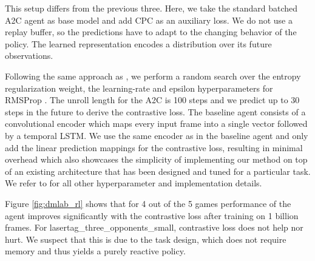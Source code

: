 This setup differs from the previous three. Here, we take the standard batched A2C \cite{mnih2016asynchronous} agent as base model and add CPC as an auxiliary loss. We do not use a replay buffer, so the predictions have to adapt to the changing behavior of the policy. The learned representation encodes a distribution over its future observations.

Following the same approach as \cite{lasse2018impala}, we perform a random search over the entropy regularization weight, the learning-rate and epsilon hyperparameters for RMSProp \cite{hinton2012neural}. The unroll length for the A2C is 100 steps and we predict up to 30 steps in the future to derive the contrastive loss. The baseline agent consists of a convolutional encoder which maps every input frame into a single vector followed by a temporal LSTM. We use the same encoder as in the baseline agent and only add the linear prediction mappings for the contrastive loss, resulting in minimal overhead which also showcases the simplicity of implementing our method on top of an existing architecture that has been designed and tuned for a particular task. We refer to \cite{lasse2018impala} for all other hyperparameter and implementation details. 

Figure \ref{fig:dmlab_rl} shows that for 4 out of the 5 games performance of the agent improves significantly with the contrastive loss after training on 1 billion frames. For \mbox{lasertag\_three\_opponents\_small}, contrastive loss does not help nor hurt. We suspect that this is due to the task design, which does not require memory and thus yields a purely reactive policy.
